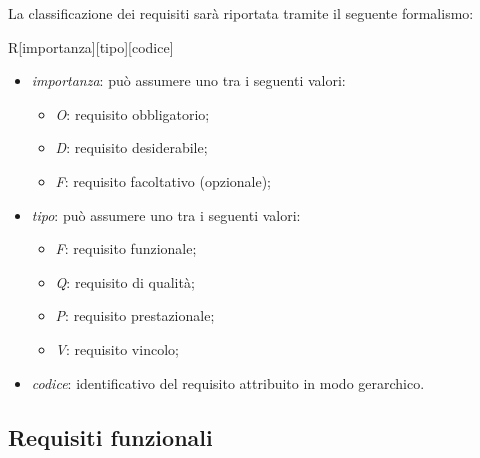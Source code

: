 La classificazione dei requisiti sarà riportata tramite il seguente formalismo:
\begin{center}
	R[importanza][tipo][codice]
\end{center}
\begin{itemize}
	\item \emph{importanza}: può assumere uno tra i seguenti valori:
	\begin{itemize}
		\item \emph{O}: requisito obbligatorio;
		\item \emph{D}: requisito desiderabile;
		\item \emph{F}: requisito facoltativo (opzionale);
	\end{itemize}
	\item \emph{tipo}: può assumere uno tra i seguenti valori:
	\begin{itemize}
		\item \emph{F}: requisito funzionale;
		\item \emph{Q}: requisito di qualità;
		\item \emph{P}: requisito prestazionale;
		\item \emph{V}: requisito vincolo;
	\end{itemize}
	\item \emph{codice}: identificativo del requisito attribuito in modo gerarchico.
\end{itemize}


\subsection{Requisiti funzionali}

